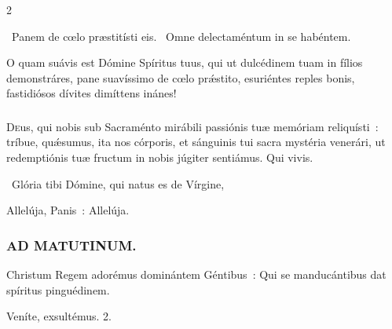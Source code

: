 \documentclass[9pt,twoside]{extarticle}
\begin{document}
\begin{multicols}{2}
{{\begin{tightlist}{}
\item {}~Panem de cœlo præstitísti eis. ~Omne delectaméntum in se habéntem.
\item {} O quam suávis est Dómine Spíritus tuus, qui ut dulcédinem tuam in fílios demonstráres, pane suavíssimo de cœlo prǽstito, esuriéntes reples bonis, fastidiósos dívites dimíttens inánes!
\end{tightlist}
\subsubsection*{\center {}}
\lettrine{D}eus, qui nobis sub Sacraménto mirábili passiónis tuæ memóriam reliquísti~: tríbue, quǽsumus, ita nos córporis, et sánguinis tui sacra mystéria venerári, ut redemptiónis tuæ fructum in nobis júgiter sentiámus. Qui vivis.

\begin{tightlist}{}
\item {}~Glória tibi Dómine, qui natus es de Vírgine, 
\item {} Allelúja, Panis~:  Allelúja.
\end{tightlist}

\subsubsection*{\center \textsc{AD MATUTINUM.}}
\begin{tightlist}{}
\item {} Christum Regem adorémus dominántem Géntibus~: \textred{*} Qui se manducántibus dat spíritus pinguédinem.
\item {} Veníte, exsultémus. 2.
\end{tightlist}

}}
\end{multicols}
\end{document}
